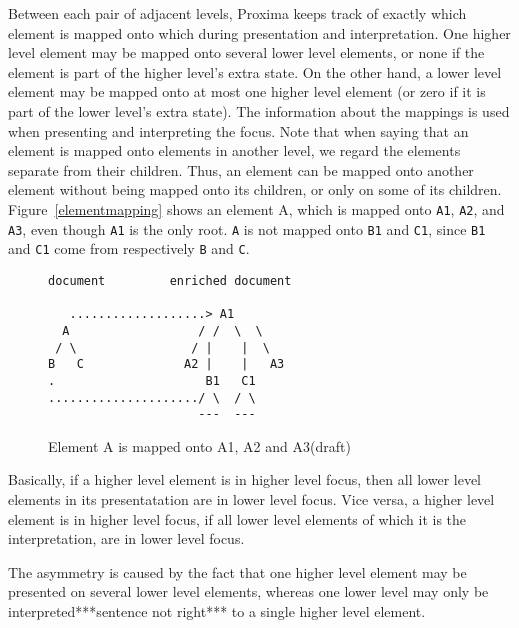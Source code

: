 Between each pair of adjacent levels, Proxima keeps track of exactly which element is mapped onto which during presentation and interpretation.  One higher level element may be mapped onto several lower level elements, or none if the element is part of the higher level's extra state. On the other hand, a lower level element may be mapped onto at most one higher level element (or zero if it is part of the lower level's extra state). The information about the mappings is used when presenting and interpreting the focus. Note that when saying that an element is mapped onto elements in another level, we regard the elements separate from their children. Thus, an element can be mapped onto another element without being mapped onto its children, or only on some of its children. Figure~\ref{elementmapping} shows an element A, which is mapped onto \verb|A1|, \verb|A2|, and \verb|A3|, even though \verb|A1| is the only root. \verb|A| is not mapped onto \verb|B1| and \verb|C1|, since \verb|B1| and \verb|C1| come from respectively \verb|B| and \verb|C|.  

\begin{figure}
\begin{small}
\begin{center}
\begin{verbatim}
document         enriched document

   ...................> A1
  A                  / /  \  \ 
 / \                / |    |  \ 
B   C              A2 |    |   A3
.                     B1   C1  
...................../ \  / \
                     ---  ---
\end{verbatim}
\caption{Element A is mapped onto A1, A2 and A3(draft)}\label{unpresentableFocus} 
\end{center}
\end{small}
\end{figure}

Basically, if a higher level element is in higher level focus, then all lower level elements in its presentatation are in lower level focus. Vice versa, a higher level element is in higher level focus, if all lower level elements of which it is the interpretation, are in lower level focus. 

\bc
The asymmetry is caused by the fact that one higher level element may be presented on several lower level elements, whereas one lower level may only be interpreted***sentence not right*** to a single higher level element.
\ec

